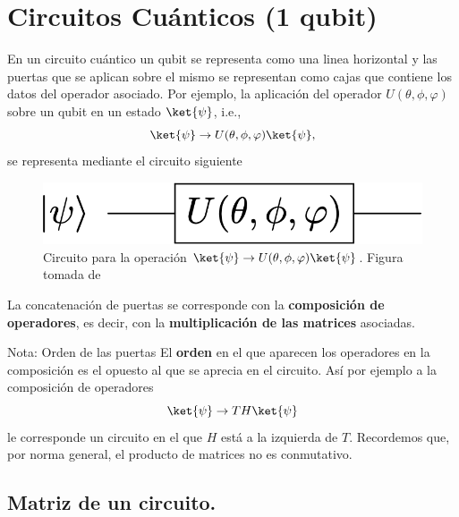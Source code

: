 \documentclass[a4paper,11pt]{book} %
\numberwithin{equation}{chapter}
\begin{document}
  
    \section{Circuitos Cuánticos (1 qubit)}
    
En un circuito cuántico un qubit se representa como una linea horizontal y las puertas que se aplican sobre 
el mismo se representan como cajas que contiene los datos del operador asociado. Por ejemplo, la aplicación del operador $U(\theta,\phi,\varphi)$ sobre un qubit en un estado $\ket{\psi}$, i.e.,
	\begin{equation*}
	\ket{\psi} \to  U(\theta,\phi,\varphi)\ket{\psi},
	\end{equation*}
se representa mediante el circuito siguiente
	\begin{figure}[H]
	\centering 
	\includegraphics[width=0.3\linewidth]{Figuras/Fig_puertas_simples.png}
	\caption{Circuito para la operación $\ket{\psi} \to  U(\theta,\phi,\varphi)\ket{\psi}$. Figura tomada de \cite{bib_Curso-JMas}}
	\label{Fig_puertas_simples}
	\end{figure}
	
 La concatenación de puertas se corresponde con la \textbf{composición de operadores}, es decir, con la \textbf{multiplicación de las matrices} asociadas. 

	\begin{mybox_blue}{Nota: Orden de las puertas}
	El \textbf{orden} en el que aparecen los operadores en la composición es el opuesto al que se 
	aprecia en el circuito. Así por ejemplo a la composición de operadores 
	\begin{equation}
	\ket{\psi} \to  TH \ket{\psi} 
	\end{equation}
	le corresponde un circuito en el que  $H$ está a la izquierda de $T$. Recordemos que, por norma general,
	el producto de matrices no es conmutativo.
	\end{mybox_blue} 
 
 


		\subsection{Matriz de un circuito.}
		
\end{document}
